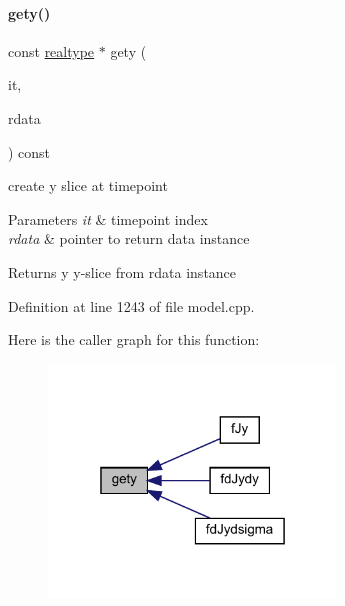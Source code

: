 \paragraph{\texorpdfstring{gety()}{gety()}}
{\footnotesize\ttfamily const \mbox{\hyperlink{namespaceamici_a1bdce28051d6a53868f7ccbf5f2c14a3}{realtype}} $\ast$ gety (\begin{DoxyParamCaption}\item[{const int}]{it,  }\item[{const \mbox{\hyperlink{classamici_1_1_return_data}{Return\+Data}} $\ast$}]{rdata }\end{DoxyParamCaption}) const\hspace{0.3cm}{\ttfamily [protected]}}

create y slice at timepoint 
\begin{DoxyParams}{Parameters}
{\em it} & timepoint index \\
\hline
{\em rdata} & pointer to return data instance \\
\hline
\end{DoxyParams}
\begin{DoxyReturn}{Returns}
y y-\/slice from rdata instance 
\end{DoxyReturn}


Definition at line 1243 of file model.\+cpp.

Here is the caller graph for this function\+:
\nopagebreak
\begin{figure}[H]
\begin{center}
\leavevmode
\includegraphics[width=217pt]{classamici_1_1_model_aee6c7b534a091180c01aabb3be44a216_icgraph}
\end{center}
\end{figure}
\mbox{\label{classamici_1_1_model_abefad4b8b4ba76bad66f57504affca9b}} 
